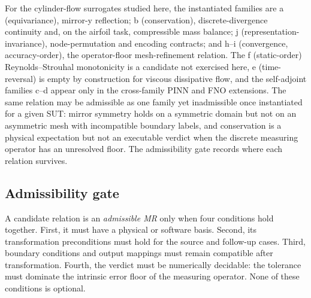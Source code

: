 \documentclass[preprint,12pt]{elsarticle}
\begin{document}
For the cylinder-flow surrogates studied here, the instantiated families are a (equivariance), mirror-y reflection; b (conservation), discrete-divergence continuity and, on the airfoil task, compressible mass balance; j (representation-invariance), node-permutation and encoding contracts; and h--i (convergence, accuracy-order), the operator-floor mesh-refinement relation. The f (static-order) Reynolds--Strouhal monotonicity is a candidate not exercised here, e (time-reversal) is empty by construction for viscous dissipative flow, and the self-adjoint families c--d appear only in the cross-family PINN and FNO extensions. The same relation may be admissible as one family yet inadmissible once instantiated for a given SUT: mirror symmetry holds on a symmetric domain but not on an asymmetric mesh with incompatible boundary labels, and conservation is a physical expectation but not an executable verdict when the discrete measuring operator has an unresolved floor. The admissibility gate records where each relation survives.

\subsection{Admissibility gate}
\label{subsec:rubric}

A candidate relation is an \emph{admissible MR} only when four conditions hold together. First, it must have a physical or software basis. Second, its transformation preconditions must hold for the source and follow-up cases. Third, boundary conditions and output mappings must remain compatible after transformation. Fourth, the verdict must be numerically decidable: the tolerance must dominate the intrinsic error floor of the measuring operator. None of these conditions is optional.
\end{document}
